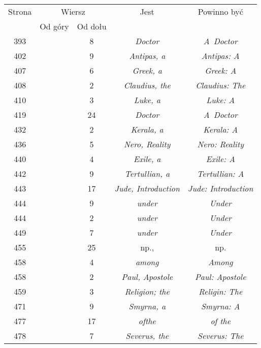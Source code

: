 \documentclass[a4paper,11pt]{article}
\numberwithin{equation}{section}
\begin{document}
\begin{center}
  \begin{tabular}{|c|c|c|c|c|}
    \hline
    Strona & \multicolumn{2}{c|}{Wiersz} & Jest
                              & Powinno być \\ \cline{2-3}
    & Od góry & Od dołu & & \\
    \hline
    393 & & \hphantom{0}8 & \textit{Doctor} & \textit{A~Doctor} \\
    402 & & \hphantom{0}9 & \textit{Antipas, a} & \textit{Antipas: A }\\
    407 & & \hphantom{0}6 & \textit{Greek, a} & \textit{Greek: A} \\
    408 & & \hphantom{0}2 & \textit{Claudius, the}
    & \textit{Claudius: The} \\
    410 & & \hphantom{0}3 & \textit{Luke, a} & \textit{Luke: A} \\
    419 & & 24 & \textit{Doctor} & \textit{A~Doctor} \\
    432 & & \hphantom{0}2 & \textit{Kerala, a} & \textit{Kerala: A} \\
    436 & & \hphantom{0}5 & \textit{Nero, Reality}
    & \textit{Nero: Reality} \\
    440 & & \hphantom{0}4 & \textit{Exile, a} & \textit{Exile: A} \\
    442 & & \hphantom{0}9 & \textit{Tertullian, a}
    & \textit{Tertullian: A} \\
    443 & & 17 & \textit{Jude, Introduction}
           & \textit{Jude: Introduction} \\
    444 & & \hphantom{0}9 & \textit{under} & \textit{Under} \\
    444 & & \hphantom{0}2 & \textit{under} & \textit{Under} \\
    449 & & \hphantom{0}7 & \textit{under} & \textit{Under} \\
    455 & & 25 & np., & np. \\
    458 & & \hphantom{0}4 & \textit{among} & \textit{Among} \\
    458 & & \hphantom{0}2 & \textit{Paul, Apostole}
    & \textit{Paul: Apostole} \\
    459 & & \hphantom{0}3 & \textit{Religion; the}
    & \textit{Religin: The} \\
    471 & & \hphantom{0}9 & \textit{Smyrna, a} & \textit{Smyrna: A} \\
    477 & & 17 & \textit{ofthe} & \textit{of the} \\
    478 & & \hphantom{0}7 & \textit{Severus, the} & \textit{Severus: The} \\

\end{tabular}
\end{center}
\end{document}

